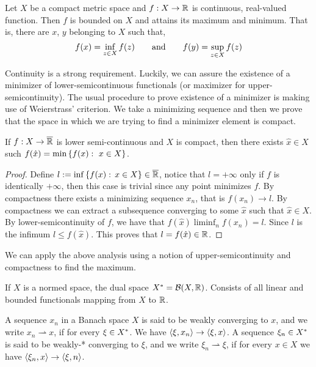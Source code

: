 \begin{theorem}
	Let $X$ be a compact metric space and $f: X\rightarrow \mathbb{R}$ is continuous, real-valued function. Then $f$ is bounded on $X$ and attains its maximum and minimum. That is, there are $x$, $y$ belonging to $X$ such that,
	\begin{equation*}
	f(x)=\inf_{z\in X}f(z) \qquad \mathrm{and} \qquad f(y)=\sup_{z \in X} f(z)
	\end{equation*}
\end{theorem}

Continuity is a strong requirement. Luckily, we can assure the existence of a minimizer of lower-semicontinuous functionals (or maximizer for upper-semicontinuity). The usual procedure to prove existence of a minimizer is making use of Weierstrass' criterion. We take a minimizing sequence and then we prove that the space in which we are trying to find a minimizer element is compact.

\begin{theorem}
	If $f: X\rightarrow\overline{\mathbb{R}}$ is lower semi-continuous and $X$ is compact, then there exists $\hat x \in X$ such $f(\hat x)=\min\left\lbrace f(x):\ x\in X \right\rbrace$.
	\begin{proof}
		Define $l:=\inf\left\lbrace f(x): \, x \in X \right\rbrace \in \overline{\mathbb{R}}$, notice that $l=+\infty$ only if $f$ is identically $+\infty$, then this case is trivial since any point minimizes $f$. By compactness there exists a minimizing sequence $x_n$, that is $f(x_n)\rightarrow l$. By compactness we can extract a subsequence converging to some $\hat x$ such that $\hat x \in X$. By lower-semicontinuity of $f$, we have that $f(\hat x)\liminf_n f(x_n)=l$. Since $l$ is the infimum $l\leq f(\hat x)$. This proves that $l=f(\hat{x}) \in \mathbb{R}$.
	\end{proof}
\end{theorem}

We can apply the above analysis using a notion of upper-semicontinuity and compactness to find the maximum.

\begin{definition}
	If $X$ is a normed space, the dual space ${X}^*=\mathcal B(X, \mathbb{R})$. Consists of all linear and bounded functionals mapping from $X$ to $\mathbb{R}$.
\end{definition}

\begin{definition}
	A sequence $x_n$ in a Banach space $X$ is said to be weakly converging to $x$, and we write $x_n \rightharpoonup x$, if for every $\xi \in {X}^*$. We have $\left\langle \xi, x_n \right\rangle\rightarrow \left\langle \xi, x \right\rangle$. A sequence $\xi_n \in {X}^*$ is said to be weakly-* converging to $\xi$, and we write $\xi_n \rightharpoonup \xi$, if for every $x\in X$ we have $\left\langle \xi_n, x \right\rangle \rightarrow \left\langle \xi, n \right\rangle$.
\end{definition}

